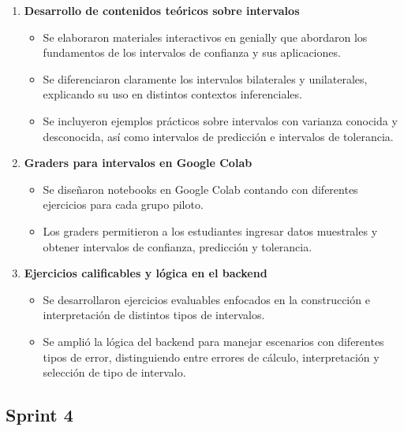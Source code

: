 \documentclass[letter,oneside,12pt,spanish]{report}
\begin{document}
\begin{enumerate}
	\item \textbf{Desarrollo de contenidos teóricos sobre intervalos}  
	\begin{itemize}
		\item Se elaboraron materiales interactivos en genially que abordaron los fundamentos de los intervalos de confianza y sus aplicaciones.
		\item Se diferenciaron claramente los intervalos bilaterales y unilaterales, explicando su uso en distintos contextos inferenciales.
		\item Se incluyeron ejemplos prácticos sobre intervalos con varianza conocida y desconocida, así como intervalos de predicción e intervalos de tolerancia.
	\end{itemize}
	
	\item \textbf{Graders para intervalos en Google Colab}  
	\begin{itemize}
		\item Se diseñaron notebooks en Google Colab contando con diferentes ejercicios para cada grupo piloto.
		\item Los graders permitieron a los estudiantes ingresar datos muestrales y obtener intervalos de confianza, predicción y tolerancia.
	\end{itemize}
	
	\item \textbf{Ejercicios calificables y lógica en el backend}  
	\begin{itemize}
		\item Se desarrollaron ejercicios evaluables enfocados en la construcción e interpretación de distintos tipos de intervalos.
		\item Se amplió la lógica del backend para manejar escenarios con diferentes tipos de error, distinguiendo entre errores de cálculo, interpretación y selección de tipo de intervalo.
	\end{itemize}
	
\end{enumerate}

\subsection{Sprint 4}
\end{document}
